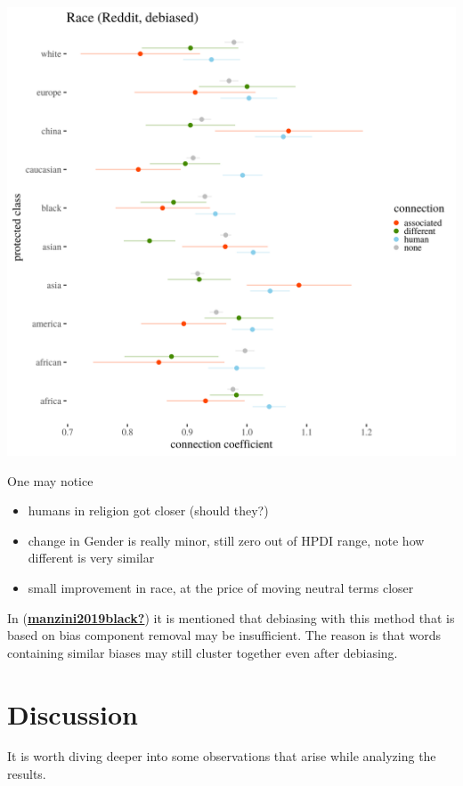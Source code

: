 \documentclass[
  12pt,
]{book}
\begin{document}
\includegraphics[width=14cm]{../images/visDebRaceReddit.png}

One may notice

\begin{itemize}
\item
  humans in religion got closer (should they?)
\item
  change in Gender is really minor, still zero out of HPDI range, note how different is very similar
\item
  small improvement in race, at the price of moving neutral terms closer
\end{itemize}

In (\protect\hyperlink{ref-manzini2019black}{\textbf{manzini2019black?}}) it is mentioned that debiasing with this method that is based on bias component removal may be insufficient. The reason is that words containing similar biases may still cluster together even after debiasing.

\hypertarget{discussion}{%
\chapter{Discussion}\label{discussion}}

It is worth diving deeper into some observations that arise while analyzing the results.
\end{document}
